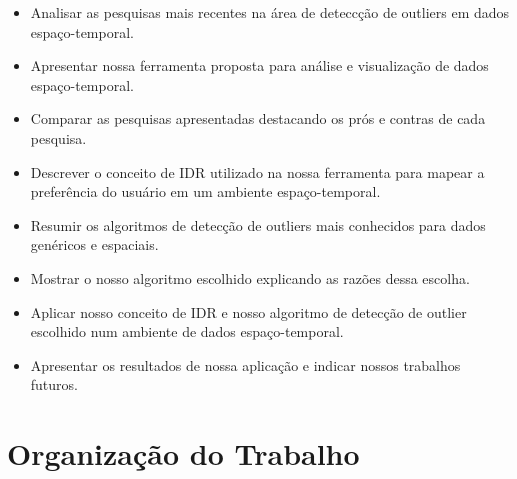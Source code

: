 \begin{itemize}
	\item
	      Analisar as pesquisas mais recentes na área de deteccção de outliers em dados espaço-temporal.
	\item
	      Apresentar nossa ferramenta proposta para análise e visualização de dados espaço-temporal.
	\item
	      Comparar as pesquisas apresentadas destacando os prós e contras de cada pesquisa.
	\item
	      Descrever o conceito de IDR utilizado na nossa ferramenta para mapear a preferência do usuário em um ambiente espaço-temporal.
	\item
	      Resumir os algoritmos de detecção de outliers mais conhecidos para dados genéricos e espaciais.
	\item
	      Mostrar o nosso algoritmo escolhido explicando as razões dessa escolha.
	\item
	      Aplicar nosso conceito de IDR e nosso algoritmo de detecção de outlier escolhido num ambiente de dados espaço-temporal.
	\item
	      Apresentar os resultados de nossa aplicação e indicar nossos trabalhos futuros.

\end{itemize}

\section{Organização do Trabalho}

